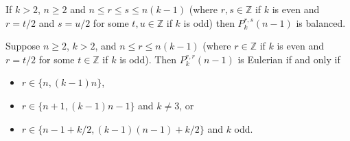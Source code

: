 \documentclass[10pt,a4paper]{amsart}
\begin{document}
\begin{lemma}  \label{lemma:P_balanced}
If $k>2$, $n\geq 2$ and $n\leq r\leq s\leq n(k-1)$ (where $r,s\in\mathbb{Z}$ if $k$ is even and
$r=t/2$ and $s=u/2$ for some $t,u\in\mathbb{Z}$ if $k$ is odd) then $P_k^{r,s}(n-1)$ is balanced.
\end{lemma}

\begin{theorem}  \label{theorem:P_characteristic_a}
Suppose $n\geq2$, $k>2$, and $n\leq r\leq n(k-1)$ (where $r\in\mathbb{Z}$ if $k$ is even and
$r=t/2$ for some $t\in\mathbb{Z}$ if $k$ is odd). Then $P_k^{r,r}(n-1)$ is Eulerian if and only if
\begin{itemize}
\item[(i)] $r\in\{n,(k-1)n\}$,
\item[(ii)] $r\in\{n+1,(k-1)n-1\}$ and $k\neq3$, or
\item[(iii)]  $r\in\{n-1+k/2,(k-1)(n-1)+k/2\}$ and $k$ odd.
\end{itemize}
\end{theorem}
\end{document}
